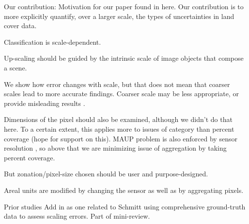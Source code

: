 \documentclass[a4paper]{article}
\begin{document}
Our contribution: 
Motivation for our paper found in here. Our contribution is to more explicitly quantify, over a larger scale, the types of uncertainties in land cover data.  

Classification is scale-dependent. 

\citep{hay_comparison_2003}
Up-scaling should be guided by the intrinsic scale of image objects that compose a scene. 

We show how error changes with scale, but that does not mean that coarser scales lead to more accurate findings.  Coarser scale may be less appropriate, or provide misleading results \citep{nelson_analysing_2001}. 

Dimensions of the pixel should also be examined, although we didn't do that here.  To a certain extent, this applies more to issues of category than percent coverage (hope for support on this).  MAUP problem is also enforced by sensor resolution \citep{hay_comparison_2003,marceau_remote_1994}, so above that we are minimizing issue of aggregation by taking percent coverage. 

But zonation/pixel-size chosen should be user and purpose-designed.  

\citep{marceau_remote_1999}
Areal units are modified by changing the sensor as well as by aggregating pixels. 

Prior studies
Add in \cite{dendoncker_exploring_2008} as one related to Schmitt using comprehensive ground-truth data to assess scaling errors.  Part of mini-review. 
\end{document}

